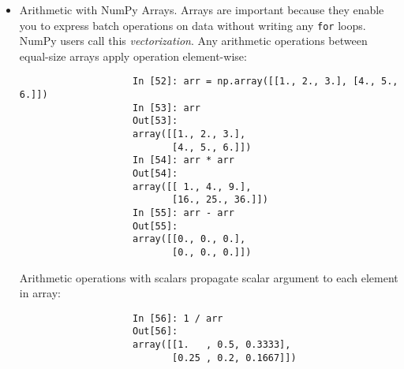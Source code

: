 \documentclass{article}
\newtheorem{remark}{Remark}
\begin{document}
\begin{enumerate}
\begin{itemize}
\begin{itemize}
\begin{itemize}
				Can also use another array's {\tt dtype} attribute:
				\begin{verbatim}
					In [47]: int_array = np.arange(10)
					In [48]: calibers = np.array([.22, .270, .357, .380, .44, .50], dtype=np.float64)
					In [49]: int_array.astype(calibers.dtype)
					Out[49]: array([0., 1., 2., 3., 4., 5., 6., 7., 8., 9.])
				\end{verbatim}
				There are shorthand type code strings you can also use to refer to a {\tt dtype}:
				\begin{verbatim}
					In [50]: zeros_uint32 = np.zeros(8, dtype="u4")
					In [51]: zeros_uint32
					Out[51]: array([0, 0, 0, 0, 0, 0, 0, 0], dtype=uint32)
				\end{verbatim}
				
				\begin{remark}
					Call {\tt astype} \emph{always} creates a new array (a copy of data), even if new data type is same as old data type.
				\end{remark}
				\item {\sf Arithmetic with NumPy Arrays.} Arrays are important because they enable you to express batch operations on data without writing any {\tt for} loops. NumPy users call this {\it vectorization}. Any arithmetic operations between equal-size arrays apply operation element-wise:
				\begin{verbatim}
					In [52]: arr = np.array([[1., 2., 3.], [4., 5., 6.]])
					In [53]: arr
					Out[53]:
					array([[1., 2., 3.],
					       [4., 5., 6.]])
					In [54]: arr * arr
					Out[54]:
					array([[ 1., 4., 9.],
					       [16., 25., 36.]])
					In [55]: arr - arr
					Out[55]:
					array([[0., 0., 0.],
					       [0., 0., 0.]])
				\end{verbatim}
				Arithmetic operations with scalars propagate scalar argument to each element in array:
				\begin{verbatim}
					In [56]: 1 / arr
					Out[56]:
					array([[1.   , 0.5, 0.3333],
					       [0.25 , 0.2, 0.1667]])
					

\end{verbatim}
\end{itemize}
\end{itemize}
\end{itemize}
\end{enumerate}
\end{document}
